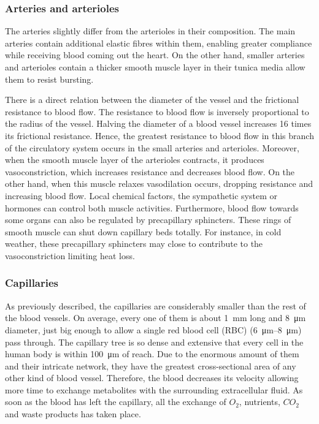 \subsubsection{Arteries and arterioles}
The arteries slightly differ from the arterioles in their composition. The main arteries contain additional elastic fibres within them, enabling greater compliance while receiving blood coming out the heart. On the other hand, smaller arteries and arterioles contain a thicker smooth muscle layer in their tunica media allow them to resist bursting.  

There is a direct relation between the diameter of the vessel and the frictional resistance to blood flow. The resistance to blood flow is inversely proportional to the radius of the vessel. Halving the diameter of a blood vessel increases 16 times its frictional resistance. Hence, the greatest resistance to blood flow in this branch of the circulatory system occurs in the small arteries and arterioles. Moreover, when the smooth muscle layer of the arterioles contracts, it produces vasoconstriction, which increases resistance and decreases blood flow. On the other hand, when this muscle relaxes vasodilation occurs, dropping resistance and increasing blood flow. Local chemical factors, the sympathetic system or hormones can control both muscle activities. Furthermore, blood flow towards some organs can also be regulated by precapillary sphincters. These rings of smooth muscle can shut down capillary beds totally. For instance, in cold weather, these precapillary sphincters may close to contribute to the vasoconstriction limiting heat loss.  

\subsubsection{Capillaries}
As previously described, the capillaries are considerably smaller than the rest of the blood vessels. On average, every one of them is about \SI{1}{\milli\meter} long and \SI{8}{\micro\meter} diameter, just big enough to allow a single red blood cell (RBC) (\SIrange{6}{8}{\micro\meter}) pass through. The capillary tree is so dense and extensive that every cell in the human body is within \SI{100}{\micro\meter} of reach.  Due to the enormous amount of them and their intricate network,  they have the greatest cross-sectional area of any other kind of blood vessel. Therefore, the blood decreases its velocity allowing more time to exchange metabolites with the surrounding extracellular fluid. As soon as the blood has left the capillary, all the exchange of $O_2$, nutrients, $CO_2$ and waste products has taken place. 

